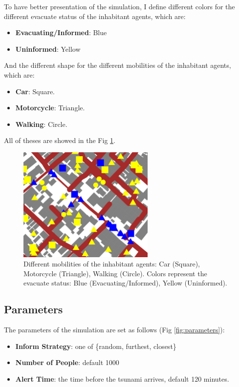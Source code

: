 \documentclass[12pt]{article}
\begin{document}
To have better presentation of the simulation, I define different colors for the different evacuate status of the inhabitant agents, which are:
\begin{itemize}
    \item \textbf{Evacuating/Informed}: Blue
    \item \textbf{Uninformed}: Yellow
\end{itemize}

And the different shape for the different mobilities of the inhabitant agents, which are:
\begin{itemize}
    \item \textbf{Car}: Square.
    \item \textbf{Motorcycle}: Triangle.
    \item \textbf{Walking}: Circle.
\end{itemize}

All of theses are showed in the Fig \ref{fig:mobilities}.

\begin{figure}
    \centering
    \includegraphics[width=0.6\textwidth]{../images/mobilities.png}
    \caption{Different mobilities of the inhabitant agents: Car (Square), Motorcycle (Triangle), Walking (Circle). Colors represent the evacuate status: Blue (Evacuating/Informed), Yellow (Uninformed).}
    \label{fig:mobilities}
\end{figure}


\subsection{Parameters}

The parameters of the simulation are set as follows (Fig \ref{fig:parameters}):
\begin{itemize}
    \item \textbf{Inform Strategy}: one of \{random, furthest, closest\}
    \item \textbf{Number of People}: default 1000
    \item \textbf{Alert Time}: the time before the tsunami arrives, default 120 minutes.
\end{itemize}
\end{document}
